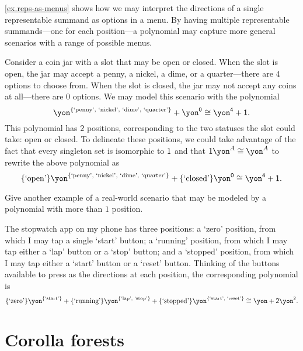 \documentclass[Book-Poly]{subfiles}
\begin{document}
\cref{ex.reps-as-menus} shows how we may interpret the directions of a single representable summand as options in a menu.
By having multiple representable summands---one for each position---a polynomial may capture more general scenarios with a range of possible menus.

\begin{example} \label{ex.coin-jar}
    Consider a coin jar with a slot that may be open or closed.
    When the slot is open, the jar may accept a penny, a nickel, a dime, or a quarter---there are $4$ options to choose from.
    When the slot is closed, the jar may not accept any coins at all---there are $0$ options.
    We may model this scenario with the polynomial
    \[
        \yon^{\{\text{`penny', `nickel', `dime', `quarter'}\}}+\yon^\0 \iso \yon^\4+\1.
    \]
    This polynomial has $2$ positions, corresponding to the two statuses the slot could take: open or closed.
    To delineate these positions, we could take advantage of the fact that every singleton set is isomorphic to $\textsf{1}$ and that $\1\yon^A\iso\yon^A$ to rewrite the above polynomial as
    \[
        \{\text{`open'}\}\yon^{\{\text{`penny', `nickel', `dime', `quarter'}\}}+\{\text{`closed'}\}\yon^\0 \iso \yon^\4+\1.
    \]
\end{example}

\begin{exercise}
    Give another example of a real-world scenario that may be modeled by a polynomial with more than $1$ position.
\begin{solution}
    The stopwatch app on my phone has three positions: a `zero' position, from which I may tap a single `start' button; a `running' position, from which I may tap either a `lap' button or a `stop' button; and a `stopped' position, from which I may tap either a `start' button or a `reset' button. Thinking of the buttons available to press as the directions at each position, the corresponding polynomial is
    \[
        \{\text{`zero'}\}\yon^{\{\text{`start'}\}}+\{\text{`running'}\}\yon^{\{\text{`lap', `stop'}\}}+\{\text{`stopped'}\}\yon^{\{\text{`start', `reset'}\}}\iso\yon+\2\yon^\2.
    \]
\end{solution}
\end{exercise}

\section{Corolla forests}
\end{document}
